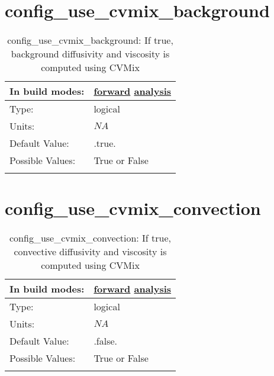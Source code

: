 \section[config\_use\_cvmix\_background]{config\_use\_cvmix\_background}
\label{sec:nm_sec_config_use_cvmix_background}
\begin{center}
\begin{longtable}{| p{2.0in} || p{4.0in} |}
    \hline
    In build modes: & \hyperref[subsec:forward_nm_tab_cvmix]{forward} \hyperref[subsec:analysis_nm_tab_cvmix]{analysis} \\
    \hline
    Type: & logical \\
    \hline
    Units: & $NA$ \\
    \hline
    Default Value: & .true. \\
    \hline
    Possible Values: & True or False \\
    \hline
    \caption{config\_use\_cvmix\_background: If true, background diffusivity and viscosity is computed using CVMix}
\end{longtable}
\end{center}
\section[config\_use\_cvmix\_convection]{config\_use\_cvmix\_convection}
\label{sec:nm_sec_config_use_cvmix_convection}
\begin{center}
\begin{longtable}{| p{2.0in} || p{4.0in} |}
    \hline
    In build modes: & \hyperref[subsec:forward_nm_tab_cvmix]{forward} \hyperref[subsec:analysis_nm_tab_cvmix]{analysis} \\
    \hline
    Type: & logical \\
    \hline
    Units: & $NA$ \\
    \hline
    Default Value: & .false. \\
    \hline
    Possible Values: & True or False \\
    \hline
    \caption{config\_use\_cvmix\_convection: If true, convective diffusivity and viscosity is computed using CVMix}
\end{longtable}
\end{center}
